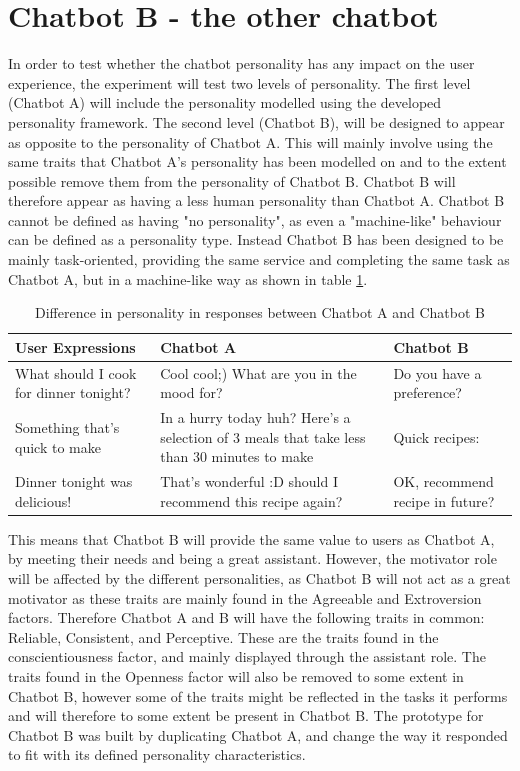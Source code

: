 \vspace{5mm}

\section{Chatbot B - the other chatbot}
In order to test whether the chatbot personality has any impact on the user experience, the experiment will test two levels of personality. The first level (Chatbot A) will include the personality modelled using the developed personality framework. The second level (Chatbot B), will be designed to appear as opposite to the personality of Chatbot A. This will mainly involve using the same traits that Chatbot A's personality has been modelled on and to the extent possible remove them from the personality of Chatbot B. Chatbot B will therefore appear as having a less human personality than Chatbot A. Chatbot B cannot be defined as having "no personality", as even a "machine-like" behaviour can be defined as a personality type. Instead Chatbot B has been designed to be mainly task-oriented, providing the same service and completing the same task as Chatbot A, but in a machine-like way as shown in table \ref{table:3}.
    
\begin{table}[h]
\begin{tabular}{ |p{3cm}||p{5cm}||p{5cm}| }
    \hline
    User Expressions & Chatbot A & Chatbot B \\ 
    \hline
    What should I cook for dinner tonight? &    Cool cool;) What are you in the mood for?   & Do you have a preference? \\
    \hline   
    Something that's quick to make &   In a hurry today huh? Here's a selection of 3 meals that take less than 30 minutes to make  & Quick recipes: \\
    \hline
    Dinner tonight was delicious! & That's wonderful :D should I recommend this recipe again?  & OK, recommend recipe in future? \\
    \hline
\end{tabular}
\caption{Difference in personality in responses between Chatbot A and Chatbot B}
\label{table:3}
\end{table}
    
This means that Chatbot B will provide the same value to users as Chatbot A, by meeting their needs and being a great assistant. However, the motivator role will be affected by the different personalities, as Chatbot B will not act as a great motivator as these traits are mainly found in the Agreeable and Extroversion factors. Therefore Chatbot A and B will have the following traits in common: Reliable, Consistent, and Perceptive. These are the traits found in the conscientiousness factor, and mainly displayed through the assistant role. The traits found in the Openness factor will also be removed to some extent in Chatbot B, however some of the traits might be reflected in the tasks it performs and will therefore to some extent be present in Chatbot B. The prototype for Chatbot B was built by duplicating Chatbot A, and change the way it responded to fit with its defined personality characteristics.

